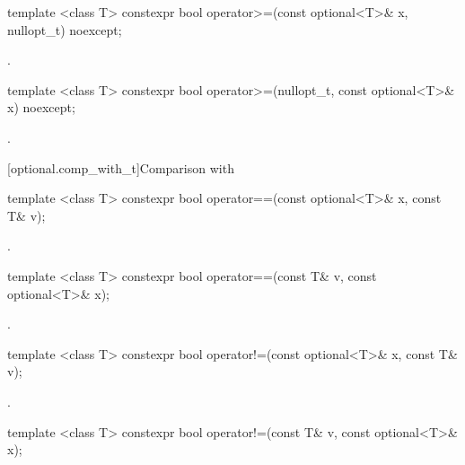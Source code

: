 %
\begin{itemdecl}
template <class T> constexpr bool operator>=(const optional<T>& x, nullopt_t) noexcept;
\end{itemdecl}

\begin{itemdescr}
\pnum
\returns
{}.
\end{itemdescr}

%
\begin{itemdecl}
template <class T> constexpr bool operator>=(nullopt_t, const optional<T>& x) noexcept;
\end{itemdecl}

\begin{itemdescr}
\pnum
\returns
{}.
\end{itemdescr}

[optional.comp_with_t]{Comparison with }

%
\begin{itemdecl}
template <class T> constexpr bool operator==(const optional<T>& x, const T& v);
\end{itemdecl}

\begin{itemdescr}
\pnum
\returns
{}.
\end{itemdescr}

%
\begin{itemdecl}
template <class T> constexpr bool operator==(const T& v, const optional<T>& x);
\end{itemdecl}

\begin{itemdescr}
\pnum
\returns
{}.
\end{itemdescr}

%
\begin{itemdecl}
template <class T> constexpr bool operator!=(const optional<T>& x, const T& v);
\end{itemdecl}

\begin{itemdescr}
\pnum
\returns
{}.
\end{itemdescr}

%
\begin{itemdecl}
template <class T> constexpr bool operator!=(const T& v, const optional<T>& x);
\end{itemdecl}


